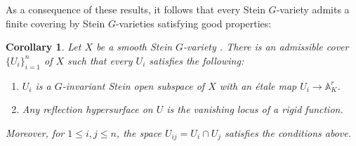\documentclass{amsart}
\newtheorem{coro}[defi]{Corollary}
\begin{document}
As a consequence of these results, it follows that every Stein $G$-variety admits a finite covering by Stein $G$-varieties satisfying good properties: 
\begin{coro}\label{coro Stein G-invariant coverings}
Let $X$ be a smooth Stein $G$-variety . There is an admissible cover $\{U_i\}_{i=1}^n$ of $X$ such that every $U_i$ satisfies the following:
\begin{enumerate}[label=(\roman*)]
    \item $U_i$ is a $G$-invariant Stein open subspace of $X$ with an étale map $U_i\rightarrow \mathbb{A}^r_K$.
    \item Any reflection hypersurface on $U$ is the vanishing locus of a rigid function.
\end{enumerate}
Moreover, for $1\leq i,j\leq n$, the space $U_{ij}=U_i\cap U_j$ satisfies the conditions above.
\end{coro}
\end{document}
